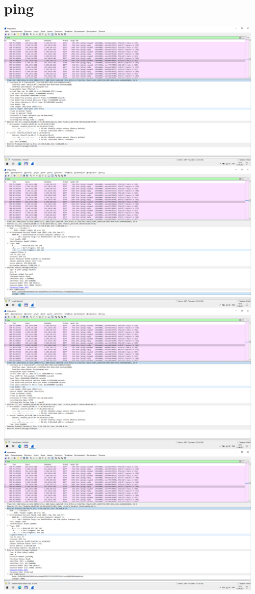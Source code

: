 \section{ping}
\includegraphics{screenshots/ping_1000_request_1}
\includegraphics{screenshots/ping_1000_request_2}
\includegraphics{screenshots/ping_1000_response_1}
\includegraphics{screenshots/ping_1000_response_2}
